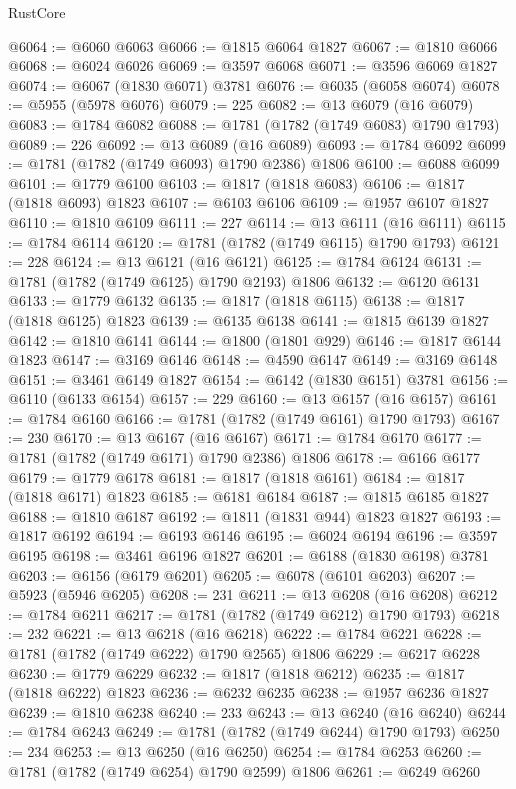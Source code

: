 \begin{lexlean}{RustCore}
\begin{coremodule}
@6064 := @6060 @6063
@6066 := @1815 @6064 @1827
@6067 := @1810 @6066
@6068 := @6024 @6026
@6069 := @3597 @6068
@6071 := @3596 @6069 @1827
@6074 := @6067 (@1830 @6071) @3781
@6076 := @6035 (@6058 @6074)
@6078 := @5955 (@5978 @6076)
@6079 := 225
@6082 := @13 @6079 (@16 @6079)
@6083 := @1784 @6082
@6088 := @1781 (@1782 (@1749 @6083) @1790 @1793)
@6089 := 226
@6092 := @13 @6089 (@16 @6089)
@6093 := @1784 @6092
@6099 := @1781 (@1782 (@1749 @6093) @1790 @2386) @1806
@6100 := @6088 @6099
@6101 := @1779 @6100
@6103 := @1817 (@1818 @6083)
@6106 := @1817 (@1818 @6093) @1823
@6107 := @6103 @6106
@6109 := @1957 @6107 @1827
@6110 := @1810 @6109
@6111 := 227
@6114 := @13 @6111 (@16 @6111)
@6115 := @1784 @6114
@6120 := @1781 (@1782 (@1749 @6115) @1790 @1793)
@6121 := 228
@6124 := @13 @6121 (@16 @6121)
@6125 := @1784 @6124
@6131 := @1781 (@1782 (@1749 @6125) @1790 @2193) @1806
@6132 := @6120 @6131
@6133 := @1779 @6132
@6135 := @1817 (@1818 @6115)
@6138 := @1817 (@1818 @6125) @1823
@6139 := @6135 @6138
@6141 := @1815 @6139 @1827
@6142 := @1810 @6141
@6144 := @1800 (@1801 @929)
@6146 := @1817 @6144 @1823
@6147 := @3169 @6146
@6148 := @4590 @6147
@6149 := @3169 @6148
@6151 := @3461 @6149 @1827
@6154 := @6142 (@1830 @6151) @3781
@6156 := @6110 (@6133 @6154)
@6157 := 229
@6160 := @13 @6157 (@16 @6157)
@6161 := @1784 @6160
@6166 := @1781 (@1782 (@1749 @6161) @1790 @1793)
@6167 := 230
@6170 := @13 @6167 (@16 @6167)
@6171 := @1784 @6170
@6177 := @1781 (@1782 (@1749 @6171) @1790 @2386) @1806
@6178 := @6166 @6177
@6179 := @1779 @6178
@6181 := @1817 (@1818 @6161)
@6184 := @1817 (@1818 @6171) @1823
@6185 := @6181 @6184
@6187 := @1815 @6185 @1827
@6188 := @1810 @6187
@6192 := @1811 (@1831 @944) @1823 @1827
@6193 := @1817 @6192
@6194 := @6193 @6146
@6195 := @6024 @6194
@6196 := @3597 @6195
@6198 := @3461 @6196 @1827
@6201 := @6188 (@1830 @6198) @3781
@6203 := @6156 (@6179 @6201)
@6205 := @6078 (@6101 @6203)
@6207 := @5923 (@5946 @6205)
@6208 := 231
@6211 := @13 @6208 (@16 @6208)
@6212 := @1784 @6211
@6217 := @1781 (@1782 (@1749 @6212) @1790 @1793)
@6218 := 232
@6221 := @13 @6218 (@16 @6218)
@6222 := @1784 @6221
@6228 := @1781 (@1782 (@1749 @6222) @1790 @2565) @1806
@6229 := @6217 @6228
@6230 := @1779 @6229
@6232 := @1817 (@1818 @6212)
@6235 := @1817 (@1818 @6222) @1823
@6236 := @6232 @6235
@6238 := @1957 @6236 @1827
@6239 := @1810 @6238
@6240 := 233
@6243 := @13 @6240 (@16 @6240)
@6244 := @1784 @6243
@6249 := @1781 (@1782 (@1749 @6244) @1790 @1793)
@6250 := 234
@6253 := @13 @6250 (@16 @6250)
@6254 := @1784 @6253
@6260 := @1781 (@1782 (@1749 @6254) @1790 @2599) @1806
@6261 := @6249 @6260

\end{coremodule}
\end{lexlean}

